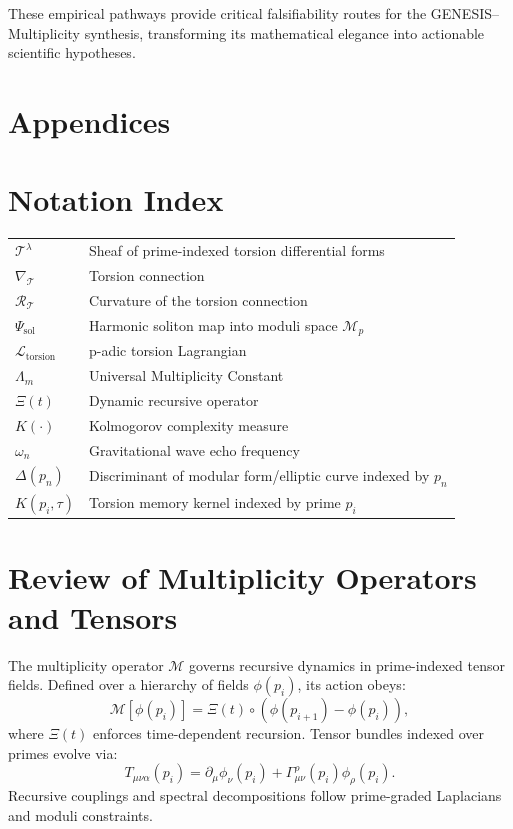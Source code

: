 \documentclass{article}
\theoremstyle{plain}
\begin{document}
These empirical pathways provide critical falsifiability routes for the GENESIS–Multiplicity synthesis, transforming its mathematical elegance into actionable scientific hypotheses.

\nocite{*}



\newpage
\appendix

\section*{Appendices}

\section{Notation Index}

\begin{tabular}{ll}
$\mathcal{T}^\lambda$ & Sheaf of prime-indexed torsion differential forms \\
$\nabla_{\mathcal{T}}$ & Torsion connection \\
$\mathcal{R}_{\mathcal{T}}$ & Curvature of the torsion connection \\
$\Psi_{\text{sol}}$ & Harmonic soliton map into moduli space $\mathcal{M}_p$ \\
$\mathcal{L}_{\text{torsion}}$ & p-adic torsion Lagrangian \\
$\Lambda_m$ & Universal Multiplicity Constant \\
$\Xi(t)$ & Dynamic recursive operator \\
$K(\cdot)$ & Kolmogorov complexity measure \\
$\omega_n$ & Gravitational wave echo frequency \\
$\Delta(p_n)$ & Discriminant of modular form/elliptic curve indexed by $p_n$ \\
$K(p_i, \tau)$ & Torsion memory kernel indexed by prime $p_i$ \\
\end{tabular}

\section{Review of Multiplicity Operators and Tensors}

The multiplicity operator $\mathcal{M}$ governs recursive dynamics in prime-indexed tensor fields. Defined over a hierarchy of fields $\phi(p_i)$, its action obeys:
\[
\mathcal{M}[\phi(p_i)] = \Xi(t) \circ \left(\phi(p_{i+1}) - \phi(p_i)\right),
\]
where $\Xi(t)$ enforces time-dependent recursion. Tensor bundles indexed over primes evolve via:
\[
T_{\mu\nu\alpha}(p_i) = \partial_\mu \phi_\nu(p_i) + \Gamma^\rho_{\mu\nu}(p_i) \phi_\rho(p_i).
\]
Recursive couplings and spectral decompositions follow prime-graded Laplacians and moduli constraints.
\end{document}
